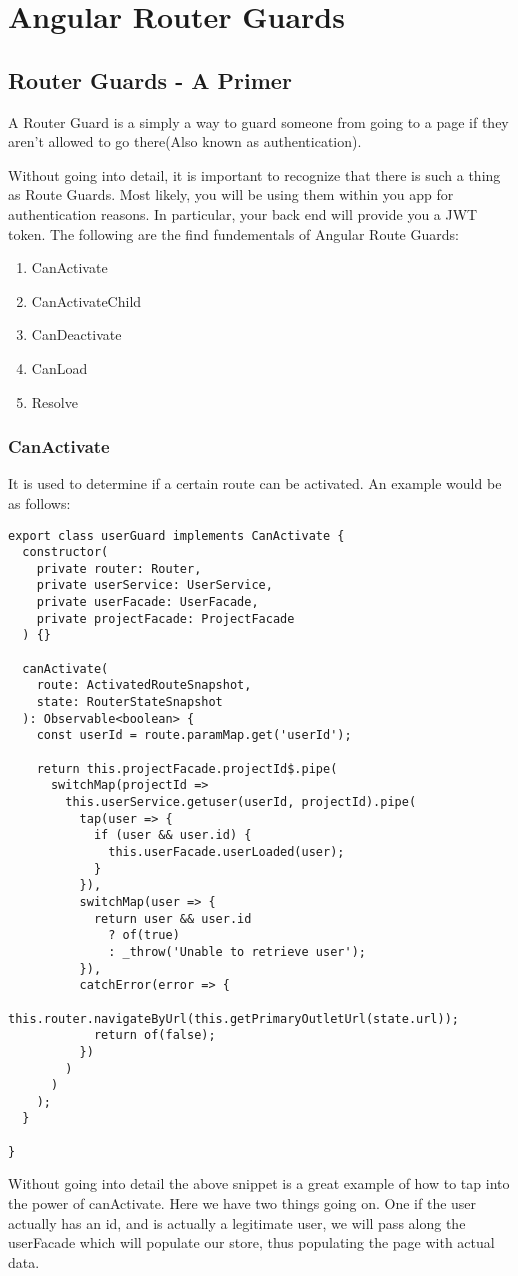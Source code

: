 
\section{ Angular Router Guards }

\subsection{ Router Guards - A Primer }
A Router Guard is a simply a way to guard someone from going to a page if they
aren't allowed to go there(Also known as authentication).

Without going into detail, it is important to recognize that there is such a
thing as Route Guards. Most likely, you will be using them within you app
for authentication reasons. In particular, your back end will provide you a JWT
token. The following are the find fundementals of Angular Route Guards:
\begin{enumerate}
  \item CanActivate
  \item CanActivateChild
  \item CanDeactivate
  \item CanLoad
  \item Resolve
\end{enumerate}

\subsubsection{ CanActivate }
It is used to determine if a certain route can be activated. An example would
be as follows:
\begin{lstlisting}
export class userGuard implements CanActivate {
  constructor(
    private router: Router,
    private userService: UserService,
    private userFacade: UserFacade,
    private projectFacade: ProjectFacade
  ) {}

  canActivate(
    route: ActivatedRouteSnapshot,
    state: RouterStateSnapshot
  ): Observable<boolean> {
    const userId = route.paramMap.get('userId');

    return this.projectFacade.projectId$.pipe(
      switchMap(projectId =>
        this.userService.getuser(userId, projectId).pipe(
          tap(user => {
            if (user && user.id) {
              this.userFacade.userLoaded(user);
            }
          }),
          switchMap(user => {
            return user && user.id
              ? of(true)
              : _throw('Unable to retrieve user');
          }),
          catchError(error => {
            this.router.navigateByUrl(this.getPrimaryOutletUrl(state.url));
            return of(false);
          })
        )
      )
    );
  }

}
\end{lstlisting}
Without going into detail the above snippet is a great example of how to tap
into the power of canActivate. Here we have two things going on. One if the user
actually has an id, and is actually a legitimate user, we will pass along the
userFacade which will populate our store, thus populating the page with actual
data.

